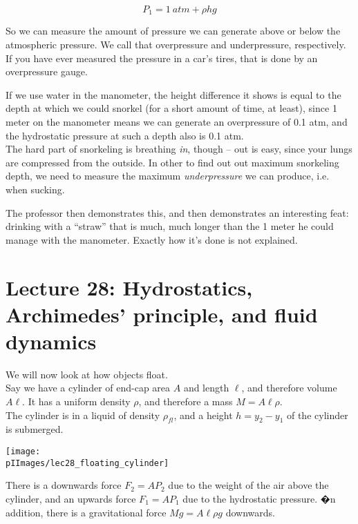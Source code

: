 \begin{equation}
P_1 = \SI{1}{atm} + \rho h g
\end{equation}

So we can measure the amount of pressure we can generate above or below the atmospheric pressure. We call that overpressure and underpressure, respectively.\\
If you have ever measured the pressure in a car's tires, that is done by an overpressure gauge.

If we use water in the manometer, the height difference it shows is equal to the depth at which we could snorkel (for a short amount of time, at least), since 1 meter on the manometer means we can generate an overpressure of 0.1 atm, and the hydrostatic pressure at such a depth also is 0.1 atm.\\
The hard part of snorkeling is breathing \emph{in}, though -- out is easy, since your lungs are compressed from the outside. In other to find out out maximum snorkeling depth, we need to measure the maximum \emph{underpressure} we can produce, i.e. when sucking.

The professor then demonstrates this, and then demonstrates an interesting feat: drinking with a ``straw'' that is much, much longer than the 1 meter he could manage with the manometer. Exactly how it's done is not explained.

\section{Lecture 28: Hydrostatics, Archimedes' principle, and fluid dynamics}

We will now look at how objects float.\\
Say we have a cylinder of end-cap area $A$ and length $\ell$, and therefore volume $A \ell$. It has a uniform density $\rho$, and therefore a mass $M = A \ell \rho$.\\
The cylinder is in a liquid of density $\rho_{fl}$, and a height $h = y_2 - y_1$ of the cylinder is submerged.

\begin{center}
\texttt{[image: \\pIImages/lec28\_floating\_cylinder]}
\end{center}

There is a downwards force $F_2 = A P_2$ due to the weight of the air above the cylinder, and an upwards force $F_1 = A P_1$ due to the hydrostatic pressure. �n addition, there is a gravitational force $M g = A \ell \rho g$ downwards.

